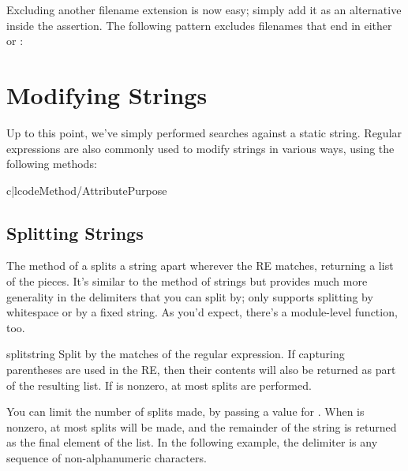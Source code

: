 \documentclass{howto}
\begin{document}
Excluding another filename extension is now easy; simply add it as an
alternative inside the assertion.  The following pattern excludes
filenames that end in either  or :



\section{Modifying Strings}

Up to this point, we've simply performed searches against a static
string.  Regular expressions are also commonly used to modify strings
in various ways, using the following  methods:

\begin{tableii}{c|l}{code}{Method/Attribute}{Purpose}
\end{tableii}


\subsection{Splitting Strings}

The  method of a  splits a string
apart wherever the RE matches, returning a list of the pieces.
It's similar to the  method of strings but
provides much more
generality in the delimiters that you can split by;
 only supports splitting by whitespace or by
a fixed string.  As you'd expect, there's a module-level
 function, too.

\begin{methoddesc}{split}{string }
  Split  by the matches of the regular expression.  If
  capturing parentheses are used in the RE, then their contents will
  also be returned as part of the resulting list.  If 
  is nonzero, at most  splits are performed.
\end{methoddesc}

You can limit the number of splits made, by passing a value for
.  When  is nonzero, at most
 splits will be made, and the remainder of the string is
returned as the final element of the list.  In the following example,
the delimiter is any sequence of non-alphanumeric characters.
\end{document}
